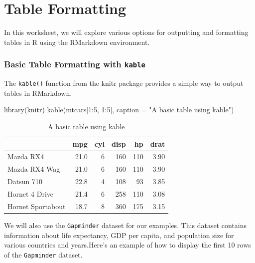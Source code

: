 \documentclass[
]{book}
\newenvironment{Shaded}{\begin{snugshade}}{\end{snugshade}}
\newcommand{\AttributeTok}[1]{\textcolor[rgb]{0.77,0.63,0.00}{#1}}
\newcommand{\DecValTok}[1]{\textcolor[rgb]{0.00,0.00,0.81}{#1}}
\newcommand{\FunctionTok}[1]{\textcolor[rgb]{0.00,0.00,0.00}{#1}}
\newcommand{\NormalTok}[1]{#1}
\newcommand{\SpecialCharTok}[1]{\textcolor[rgb]{0.00,0.00,0.00}{#1}}
\newcommand{\StringTok}[1]{\textcolor[rgb]{0.31,0.60,0.02}{#1}}
\begin{document}
\hypertarget{table-formatting}{%
\chapter{Table Formatting}\label{table-formatting}}

In this worksheet, we will explore various options for outputting and formatting tables in R using the RMarkdown environment.

\hypertarget{basic-table-formatting-with-kable}{%
\subsection{\texorpdfstring{Basic Table Formatting with \texttt{kable}}{Basic Table Formatting with kable}}\label{basic-table-formatting-with-kable}}

The \texttt{kable()} function from the knitr package provides a simple way to output tables in RMarkdown.

\begin{Shaded}
\begin{Highlighting}[]
\FunctionTok{library}\NormalTok{(knitr)}
\FunctionTok{kable}\NormalTok{(mtcars[}\DecValTok{1}\SpecialCharTok{:}\DecValTok{5}\NormalTok{, }\DecValTok{1}\SpecialCharTok{:}\DecValTok{5}\NormalTok{], }\AttributeTok{caption =} \StringTok{"A basic table using kable"}\NormalTok{)}
\end{Highlighting}
\end{Shaded}

\begin{table}

\caption{\label{tab:unnamed-chunk-1}A basic table using kable}
\centering
\begin{tabular}[t]{l|r|r|r|r|r}
\hline
  & mpg & cyl & disp & hp & drat\\
\hline
Mazda RX4 & 21.0 & 6 & 160 & 110 & 3.90\\
\hline
Mazda RX4 Wag & 21.0 & 6 & 160 & 110 & 3.90\\
\hline
Datsun 710 & 22.8 & 4 & 108 & 93 & 3.85\\
\hline
Hornet 4 Drive & 21.4 & 6 & 258 & 110 & 3.08\\
\hline
Hornet Sportabout & 18.7 & 8 & 360 & 175 & 3.15\\
\hline
\end{tabular}
\end{table}

We will also use the \texttt{Gapminder} dataset for our examples. This dataset contains information about life expectancy, GDP per capita, and population size for various countries and years.Here's an example of how to display the first 10 rows of the \texttt{Gapminder} dataset.
\end{document}
